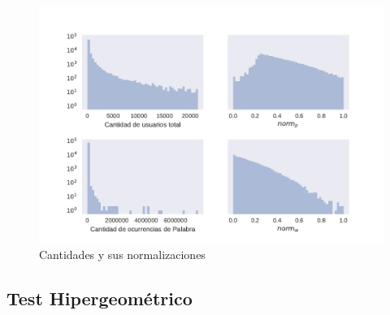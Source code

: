 \begin{figure}[!h]
\centering
\includegraphics[width=1.0\textwidth]{./images/cantNorms.pdf}
\caption{Cantidades y sus normalizaciones} 
\label{fig:cantNorms} 
\end{figure}


%

\subsection{Test Hipergeométrico}